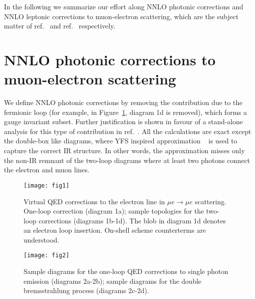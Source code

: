 \documentclass[Physsubmission, Phys]{SciPost}
\begin{document}
In the following we summarize our effort along NNLO photonic corrections and NNLO leptonic corrections to muon-electron scattering, which are the subject matter of ref.~\cite{CarloniCalame:2020yoz} and ref.~\cite{Budassi:2021twh} respectively.



\section{NNLO photonic corrections to muon-electron scattering}

We define NNLO photonic corrections by removing the contribution
due to the fermionic loop (for example, in Figure~\ref{fig:fig1}, diagram 1d is removed), which forms a gauge invariant subset. Further justification is shown in favour of a stand-alone analysis for this type of contribution in ref.~\cite{CarloniCalame:2020yoz}. All the calculations are exact except the double-box like diagrams, where YFS inspired approximation ~\cite{Yennie:1961ad} is used to capture the correct IR structure. In other words, the
approximation misses only the non-IR remnant of
the two-loop diagrams where at least two photons connect the
electron and muon lines.

\begin{figure}[hbtp]
\begin{center}
\texttt{[image: fig1]}
\end{center}
\caption{Virtual QED corrections to the electron line 
in $\mu e \to \mu e$ scattering. One-loop correction (diagram 1a); 
sample topologies for the two-loop corrections (diagrams 1b-1d). 
The blob in diagram 1d denotes an electron loop insertion. On-shell 
scheme counterterms are understood.}
\label{fig:fig1}
\end{figure}

\begin{figure}[hbtp]
\begin{center}
\texttt{[image: fig2]}
\end{center}
\caption{Sample diagrams for the one-loop QED corrections to single photon emission (diagrams 2a-2b); 
sample diagrams for the double bremsstrahlung process (diagrams 2c-2d).}
\label{fig:fig2}
\end{figure}
\end{document}
